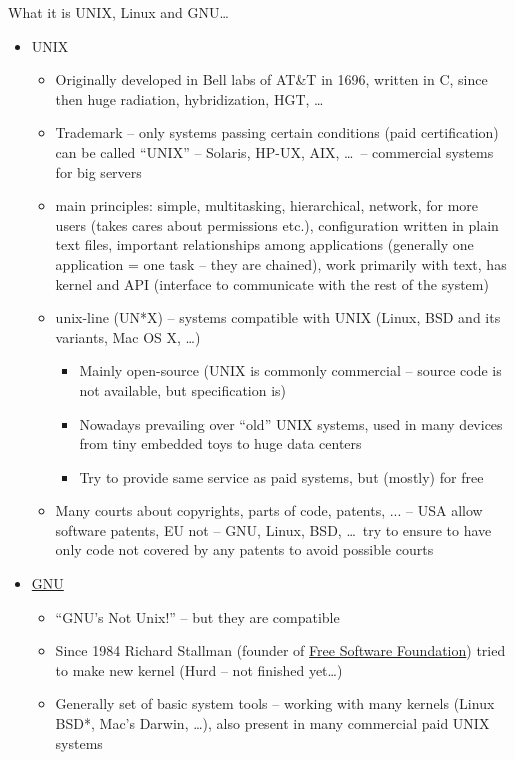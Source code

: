 \documentclass[compress, ucs, xelatex, 11pt, xcolor=svgnames,
  hyperref={
    bookmarks=true,
    unicode=true,
    colorlinks=true,
    pdftitle={Linux, command line and MetaCentrum},
    plainpages=false,
    pdfauthor={Vojtech Zeisek},
    pdfsubject={Course about use of Linux command line, writing shell scripts and using MetaCentrum of CESNET},
    pdfcreator={XeLaTeX},
    pdfkeywords={Linux, GNU, BASH, shell, command line, MetaCentrum},
    linkcolor=Red,
    anchorcolor=Blue,
    citecolor=Purple,
    filecolor=DodgerBlue,
    menucolor=DarkOrchid,
    urlcolor=DeepSkyBlue,
    pdftex},
  url={hyphens, lowtilde} %
  ]{beamer}
\begin{document}
\begin{frame}[allowframebreaks]{What it is UNIX, Linux and GNU\ldots}
\begin{itemize}
  \item UNIX
  \begin{itemize}
    \item Originally developed in Bell labs of AT\&T in 1696, written in C, since then  huge radiation, hybridization, HGT, \ldots
    \item Trademark -- only systems passing certain conditions (paid certification) can be called ``UNIX'' -- Solaris, HP-UX, AIX, \ldots~-- commercial systems for big servers
    \item main principles: simple, multitasking, hierarchical, network, for more users (takes cares about permissions etc.), configuration written in plain text files, important relationships among applications (generally one application = one task -- they are chained), work primarily with text, has kernel and API (interface to communicate with the rest of the system)
    \item unix-line (UN*X) -- systems compatible with UNIX (Linux, BSD and its variants, Mac OS X, \ldots)
    \begin{itemize}
      \item Mainly open-source (UNIX is commonly commercial -- source code is not available, but specification is)
      \item Nowadays prevailing over ``old'' UNIX systems, used in many devices from tiny embedded toys to huge data centers
      \item Try to provide same service as paid systems, but (mostly) for free
    \end{itemize}
    \item Many courts about copyrights, parts of code, patents, ... -- USA allow software patents, EU not -- GNU, Linux, BSD, \ldots~try to ensure to have only code not covered by any patents to avoid possible courts
  \end{itemize}
  \item \href{https://www.gnu.org/}{GNU}
  \begin{itemize}
    \item ``GNU's Not Unix!'' -- but they are compatible
    \item Since 1984 Richard Stallman (founder of \href{https://www.fsf.org/}{Free Software Foundation}) tried to make new kernel (Hurd -- not finished yet\ldots)
    \item Generally set of basic system tools -- working with many kernels (Linux BSD*, Mac's Darwin, \ldots), also present in many commercial paid UNIX systems

\end{itemize}
\end{itemize}
\end{frame}
\end{document}
